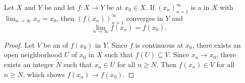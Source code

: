 \begin{lemma} \label{lemma:continuous_map_of_topological_spaces_preserves_limits_of_convergent_sequences}
    Let $X$ and $Y$ be  and let $f: X \to Y$ be  at $x_0 \in X$. If $(x_n)_{n=1}^\infty$ is a  in $X$ with $\lim_{n \to \infty} x_n = x_0$, then $(f(x_n))_{n=1}^\infty$ converges in $Y$ and
    $$\lim_{n \to \infty} f(x_n) = f(x_0).$$
\end{lemma}
\begin{proof}
    Let $V$ be an  of $f(x_0)$ in $Y$. Since $f$ is continuous at $x_0$, there exists an open neighborhood $U$ of $x_0$ in $X$ such that $f(U) \subseteq V$. Since $x_n \to x_0$, there exists an integer $N$ such that $x_n \in U$ for all $n \geq N$. Then $f(x_n) \in V$ for all $n \geq N$, which shows $f(x_n) \to f(x_0)$.
\end{proof}
